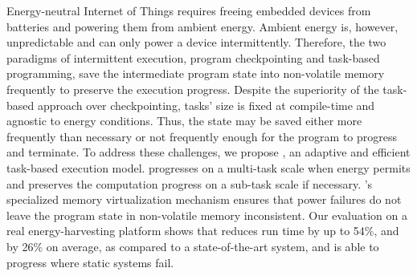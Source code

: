 Energy-neutral Internet of Things requires freeing embedded devices from batteries and powering them from ambient energy. Ambient energy is, however, unpredictable and can only power a device intermittently. Therefore, the two paradigms of intermittent execution, program checkpointing and task-based programming, save the intermediate program state into non-volatile memory frequently to preserve the execution progress. Despite the superiority of the task-based approach over checkpointing, tasks' size is fixed at compile-time and agnostic to energy conditions. Thus, the state may be saved either more frequently than necessary or not frequently enough for the program to progress and terminate. To address these challenges, we propose \sys, an adaptive and efficient task-based execution model. \sys progresses on a multi-task scale when energy permits and preserves the computation progress on a sub-task scale if necessary. \sys's specialized memory virtualization mechanism ensures that power failures do not leave the program state in non-volatile memory inconsistent. Our evaluation on a real energy-harvesting platform shows that \sys reduces run time by up to 54\%, and by 26\% on average, as compared to a state-of-the-art system, and is able to progress where static systems fail.